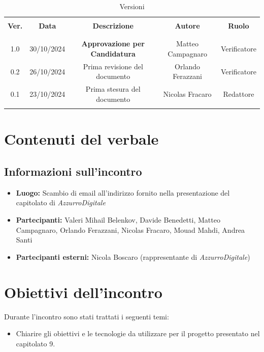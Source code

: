 \documentclass[italian, 12pt]{article}
\begin{document}
\pagestyle{mystyle}


\begin{table}[!h]
	\caption{Versioni}
	\begin{center}
		\begin{tabular}{ c c c c c}
			\hline \\[-2ex]
			\textbf{Ver.} & \textbf{Data} & \textbf{Descrizione} & \textbf{Autore} & \textbf{Ruolo}  \\
			\\[-2ex] \hline \\[-1.5ex]
            1.0 & 30/10/2024 & \textbf{Approvazione per Candidatura} & Matteo Campagnaro & Verificatore\\
			0.2 & 26/10/2024 & Prima revisione del documento & Orlando Ferazzani & Verificatore\\
			0.1 & 23/10/2024 & Prima stesura del documento & Nicolas Fracaro & Redattore\\
			\\[-1.5ex] \hline
		\end{tabular}
	\end{center}
\end{table}


\tableofcontents
\newpage

\section{Contenuti del verbale}

\subsection{Informazioni sull'incontro}
\begin{itemize}
    \item \textbf{Luogo:} Scambio di email all'indirizzo fornito nella presentazione del capitolato di \textit{AzzurroDigitale}
    \item \textbf{Partecipanti:} Valeri Mihail Belenkov, Davide Benedetti, Matteo Campagnaro, Orlando Ferazzani, Nicolas Fracaro, Mouad Mahdi, Andrea Santi
    \item \textbf{Partecipanti esterni:} Nicola Boscaro (rappresentante di \textit{AzzurroDigitale})
\end{itemize}

\section{Obiettivi dell'incontro}
Durante l'incontro sono stati trattati i seguenti temi:
\begin{itemize}
    \item Chiarire gli obiettivi e le tecnologie da utilizzare per il progetto presentato nel capitolato 9.
\end{itemize}
\end{document}
